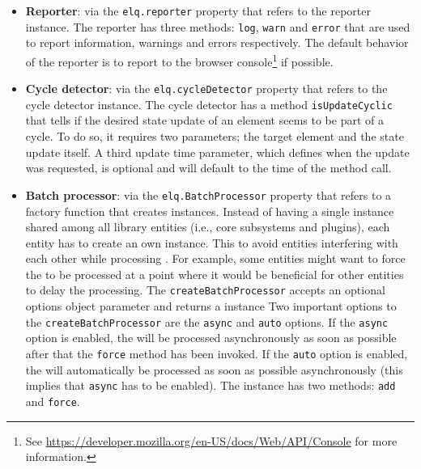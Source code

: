 \documentclass[a4paper,11pt]{kth-mag}
\newcommand{\code}[1]{\texttt{#1}}
\begin{document}
        \begin{itemize}
          \item 
            \textbf{Reporter}: via the \code{elq.reporter} property that refers to the reporter instance.
            The reporter has three methods: \code{log}, \code{warn} and \code{error} that are used to report information, warnings and errors respectively.
            The default behavior of the reporter is to report to the \gls{browser} console\footnote{See \url{https://developer.mozilla.org/en-US/docs/Web/API/Console} for more information.} if possible.
          \item
            \textbf{Cycle detector}: via the \code{elq.cycleDetector} property that refers to the cycle detector instance.
            The cycle detector has a method \code{isUpdateCyclic} that tells if the desired state update of an element seems to be part of a cycle.
            To do so, it requires two parameters; the target \gls{element} and the state update itself.
            A third update time parameter, which defines when the update was requested, is optional and will default to the time of the method call.
          \item 
            \textbf{Batch processor}: via the \code{elq.BatchProcessor} property that refers to a factory function that creates  instances.
            Instead of having a single  instance shared among all library entities (i.e., core subsystems and plugins), each entity has to create an own instance.
            This to avoid entities interfering with each other while processing .
            For example, some entities might want to force the  to be processed at a point where it would be beneficial for other entities to delay the processing.
            The \code{createBatchProcessor} accepts an optional options object parameter and returns a  instance
            Two important options to the \code{createBatchProcessor} are the \code{async} and \code{auto} options.
            If the \code{async} option is enabled, the  will be processed asynchronously as soon as possible after that the \code{force} method has been invoked.
            If the \code{auto} option is enabled, the  will automatically be processed as soon as possible asynchronously (this implies that \code{async} has to be enabled).
            The  instance has two methods: \code{add} and \code{force}.

\end{itemize}
\end{document}
